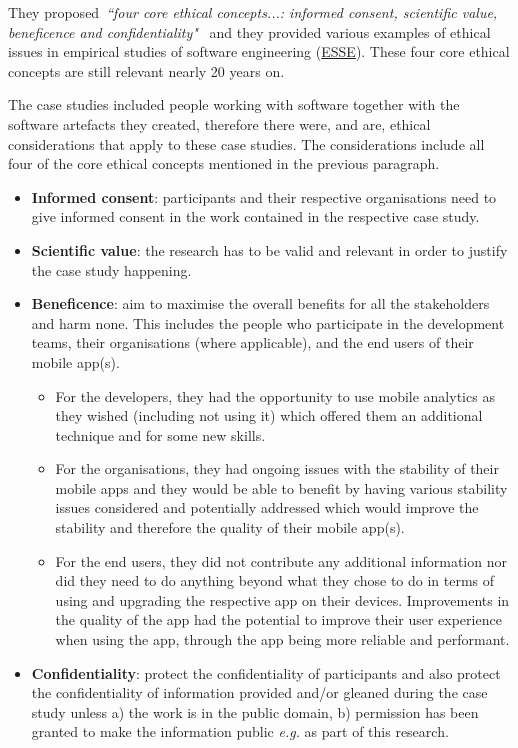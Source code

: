 They proposed~\emph{``four core ethical concepts...: informed consent, scientific value, beneficence and confidentiality"}~\citep[p.1178]{singer2002_ethical_issues_in_empirical_studies_of_software_engineering} and they provided various examples of ethical issues in empirical studies of software engineering (\href{glossary-esse}{ESSE}). These four core ethical concepts are still relevant nearly 20 years on.


The case studies included people working with software together with the software artefacts they created, therefore there were, and are, ethical considerations that apply to these case studies. The considerations include all four of the core ethical concepts mentioned in the previous paragraph.

\begin{itemize}
    \itemsep0em
    \item \textbf{Informed consent}: participants and their respective organisations need to give informed consent in the work contained in the respective case study.
    \item \textbf{Scientific value}: the research has to be valid and relevant in order to justify the case study happening.
    \item \textbf{Beneficence}: aim to maximise the overall benefits for all the stakeholders and harm none. This includes the people who participate in the development teams, their organisations (where applicable), and the end users of their mobile app(s). 
    \begin{itemize}
        \item For the developers, they had the opportunity to use mobile analytics as they wished (including not using it) which offered them an additional technique and for some new skills.
        \item For the organisations, they had ongoing issues with the stability of their mobile apps and they would be able to benefit by having various stability issues considered and potentially addressed which would improve the stability and therefore the quality of their mobile app(s).
        \item For the end users, they did not contribute any additional information nor did they need to do anything beyond what they chose to do in terms of using and upgrading the respective app on their devices. Improvements in the quality of the app had the potential to improve their user experience when using the app, through the app being more reliable and performant.
    \end{itemize}
    \item \textbf{Confidentiality}: protect the confidentiality of participants and also protect the confidentiality of information provided and/or gleaned during the case study unless a) the work is in the public domain, b) permission has been granted to make the information public \textit{e.g.} as part of this research.
\end{itemize}

